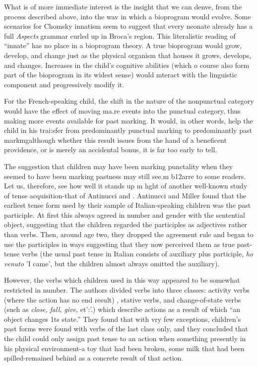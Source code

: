 What is of more immediate interest is the insight that we can denve, from the process described above, into the wav in which a bio\-program would evolve. Some scenarios for Chomsky innatism seem to suggest that every neonate already has a full \textit{Aspects} grammar curled
up in Broca's region. This literalistic reading of ``innate'' has no place in a bioprogram theory. A true bioprogram would grow, develop, and change just as the physical organism that houses it grows, develops, and changes. Increases in the child's cognitive abilities (which o course also form part of the bioprogram in its widest sense) would mteract with the linguistic component and progressively modify it.

For the French-speaking child, the shift in the nature of the
nonpunctual category would have the effect of moving ma.re events into the punctual category, thus making more events available for past marking. It would, in other words, help the child in his trai:sfer from predominantly punctual marking to predominantly past markmg\-although whether this result issues from the hand of a beneficent providence, or is merely an accidental bonus, it is far too early to tell.

The suggestion that children may have been marking punctality when they seemed to have been marking pastness may still see.m b12arre to some readers. Let us, therefore, see how well it stands up m hght of another well-known study of tense acquisition-that of Antinucci and
\citet{Miller1976}.
Antinucci and Miller found that the earliest tense form used by
their sample of Italian-speaking children was the past participle. At first this always agreed in number and gender with the sentential object, suggesting that the children regarded the participles as adjectives rather than verbs. Then, around age two, they dropped the agreement rule and began to use the participles in ways suggesting that they now perceived them as true past-tense verbs (the usual past tense in Italian consists of auxiliary plus participle, \textit{ho venuto }'I came', but the children almost always omitted the auxiliary).

However, the verbs which children used in this way appeared
to be somewhat restricted in number. The authors divided verbs into three classes: activity verbs (where the action has no end result) , stative verbs, and change-of-state verbs (such as \textit{close,} \textit{fall,} \textit{give,} et':'.) which describe actions as a result of which ``an object changes 1ts state.'' They found that with vry few exceptions, children's past
forms were found with verbs of the last class only, and they concluded that the child could only assign past tense to an action when some\-thing presently in his physical environment-a toy that had been broken, some milk that had been spilled-remained behind as a concrete result of that action.

